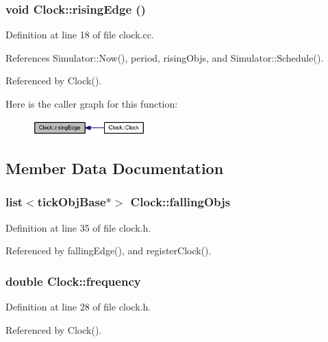 \subsubsection[{risingEdge}]{\setlength{\rightskip}{0pt plus 5cm}void Clock::risingEdge ()}\label{classClock_7e15f1ce4bbe1ee05b1336191086ec30}




Definition at line 18 of file clock.cc.

References Simulator::Now(), period, risingObjs, and Simulator::Schedule().

Referenced by Clock().

Here is the caller graph for this function:\nopagebreak
\begin{figure}[H]
\begin{center}
\leavevmode
\includegraphics[width=123pt]{classClock_7e15f1ce4bbe1ee05b1336191086ec30_icgraph}
\end{center}
\end{figure}


\subsection{Member Data Documentation}
\subsubsection[{fallingObjs}]{\setlength{\rightskip}{0pt plus 5cm}list$<${\bf tickObjBase}$\ast$$>$ {\bf Clock::fallingObjs}}\label{classClock_85868b33b134e520b3512c2130f5244f}




Definition at line 35 of file clock.h.

Referenced by fallingEdge(), and registerClock().
\subsubsection[{frequency}]{\setlength{\rightskip}{0pt plus 5cm}double {\bf Clock::frequency}}\label{classClock_d293cfc6a12bf9b6ba204cb3efc2bac4}




Definition at line 28 of file clock.h.

Referenced by Clock().
